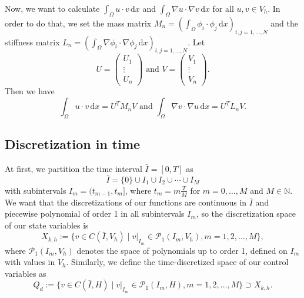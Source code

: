 Now, we want to calculate $\int_\Omega u \cdot v \,\mathrm{d}x$ and $\int_\Omega \nabla u \cdot \nabla v \,\mathrm{d}x$ for all $u,v\in  V_h$. In order to do that, we set the mass matrix $M_n = \left(\int_\Omega \phi_i \cdot \phi_j \,\mathrm{d}x\right)_{i,j=1,\dotsc,N}$ and the stiffness matrix $L_n = \left(\int_\Omega \nabla\phi_i \cdot \nabla\phi_j \,\mathrm{d}x\right)_{i,j=1,\dotsc,N}$. Let%
\begin{displaymath}
U=\begin{pmatrix} U_1 \\ \vdots \\ U_n \end{pmatrix}\text{ and }V=\begin{pmatrix} V_1 \\ \vdots \\ V_n \end{pmatrix}.
\end{displaymath}
Then we have
\begin{displaymath}
\int_\Omega u \cdot v \,\mathrm{d}x=U^TM_nV\text{ and }\int_\Omega \nabla v \cdot \nabla u \,\mathrm{d}x=U^TL_nV.
\end{displaymath}


\subsection{\label{SubsectionDiscretizationInTime}Discretization in time}
At first, we partition the time interval $\bar{I}=[0,T]$ as
\begin{displaymath}
\bar{I}=\{0\}\cup I_1\cup I_2\cup\dotsb\cup I_M
\end{displaymath}
with subintervals $I_m=(t_{m-1},t_m]$, where $t_m=m\frac{T}{M}$ for $m=0,\dotsc, M$ and $M\in\mathbb{N}$. We want that the discretizations of our functions are continuous in $\bar{I}$ and piecewise polynomial of order 1 in all subintervals $I_m$, so the discretization space of our state variables is
\begin{displaymath}
X_{k,h}:=\{v\in C(\bar{I},V_h)\mid v |_{I_m}\in\mathcal{P}_1(I_m,V_h),m=1,2,\dotsc,M\},
\end{displaymath}
where $\mathcal{P}_1(I_m,V_h)$ denotes the space of polynomials up to order 1, defined on $I_m$ with values in $V_h$.
Similarly, we define the time-discretized space of our control variables as
\begin{displaymath}
Q_d:=\{v\in C(\bar{I},H)\mid v |_{I_m}\in\mathcal{P}_1(I_m,H),m=1,2,\dotsc,M\}\supset X_{k,h}.
\end{displaymath}

